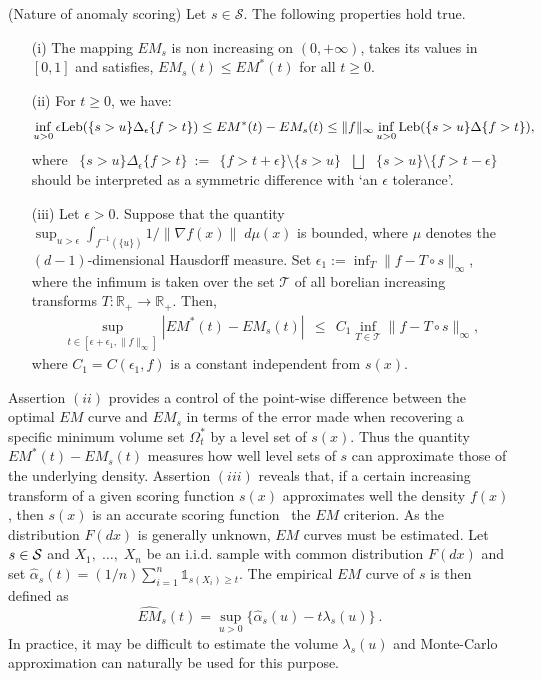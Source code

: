 \begin{proposition}
\label{aistat:propestim} ({\sc Nature of anomaly scoring}) Let $s \in \mathcal{S}$. The following properties hold true.
\begin{enumerate}
\item[(i)] The mapping $EM_s$ is non increasing on $(0,+\infty)$, takes its values in $[0,1]$ and satisfies,
$EM_s(t) \le EM^*(t)$ for all $t\geq 0$. 
\item[(ii)]  For $t \ge 0$, we have: 
$$\inf_{u>0} \epsilon \leb (\{ s >u\}\Delta_\epsilon \{f>t\}) \le EM^*(t)-EM_s(t) \le \|f\|_\infty \inf_{u>0} \leb (\{ s >u\}\Delta\{f>t\}),$$
%
where ~$\{ s >u\}\Delta_\epsilon \{f>t\} ~:=~~ \{f>t+\epsilon\} \setminus \{ s >u\} ~~~\bigsqcup~~~ \{ s >u\} \setminus \{f>t-\epsilon\}$ should be interpreted as a symmetric difference with `an $\epsilon$ tolerance'.
\item[(iii)] Let $\epsilon >0$. Suppose that the quantity $\sup_{u>\epsilon}
  \int_{f^{-1}(\{u\})} 1/\|\nabla f(x)\|\;  d\mu(x) $ is bounded,
  where $\mu$ denotes the $(d-1)$-dimensional Hausdorff measure. Set $\epsilon_1 := \inf_{T} \|f-T\circ s\|_\infty$, where the infimum is taken over the set $\mathcal{T}$ of all borelian increasing transforms $T : \mathbb{R}_+ \rightarrow \mathbb{R}_+$. Then, 
\begin{align*}
\sup_{t\in[\epsilon + \epsilon_1,\|f\|_\infty]}|EM^*(t)-EM_s(t)| ~~\le~~  C_1 \inf_{T  \in \mathcal{T}} \|f-T\circ s\|_\infty,
\end{align*}
where $C_1=C(\epsilon_1,f)$ is a constant independent from $s(x)$.
\end{enumerate}
\end{proposition}

Assertion $(ii)$ provides a control of the point-wise difference between the
optimal $EM$ curve and $EM_s$ in terms of the error made when recovering a specific minimum volume set $\Omega_t^*$ by a level set of $s(x)$. Thus the quantity $EM^*(t)-EM_s(t)$ measures how well level sets of $s$ can approximate those of the underlying density.
Assertion $(iii)$ reveals that, if a certain increasing transform of a given scoring function $s(x)$ approximates well the density $f(x)$, then $s(x)$ is an accurate scoring function \wrt~the $EM$ criterion. %
As the distribution $F(dx)$ is generally unknown, $EM$ curves must be estimated. Let $s\in \S$ and $X_1,\; \ldots,\; X_n$ be an i.i.d. sample with common distribution $F(dx)$ and set $\widehat{\alpha}_s(t)=(1/n)\sum_{i=1}^n\mathds{1}_{s(X_i)\geq t}$. The empirical $EM$ curve of $s$ is then defined as $$\widehat{EM}_s(t)=\sup_{u>0}\{ \widehat{\alpha}_s(u)-t\lambda_s(u)\}~.$$ In practice, it may be difficult to estimate the volume $\lambda_s(u)$ and Monte-Carlo approximation can naturally be used for this purpose.



